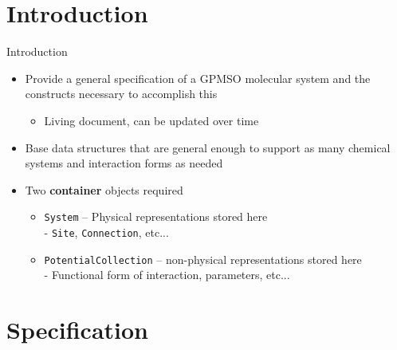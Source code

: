 \documentclass[xcolor=table]{beamer}
\begin{document}
\section{Introduction}
\begin{frame}{Introduction}
    \begin{itemize}
        \item Provide a general specification of a GPMSO molecular system and the constructs necessary to accomplish this
        \begin{itemize}
            \item Living document, can be updated over time
        \end{itemize}
        \item Base data structures that are general enough to support as many chemical systems and interaction forms as needed

        \item Two \textbf{container} objects required
        \begin{itemize}
            \item \texttt{System} -- Physical representations stored here \\
            - \texttt{Site}, \texttt{Connection}, etc...
            \item \texttt{PotentialCollection} --  non-physical representations stored here \\
            - Functional form of interaction, parameters, etc...

        \end{itemize}
    \end{itemize}
\end{frame}

\section{Specification}
\end{document}
